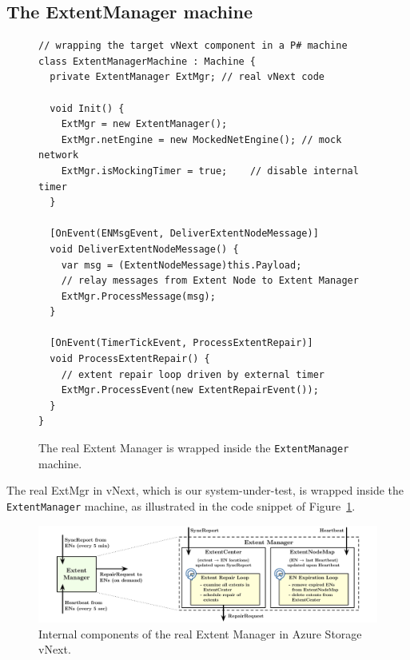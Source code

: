 \subsection{The ExtentManager machine}
\label{sec:method:wrap_target}

\begin{figure}[t]
\begin{lstlisting}
// wrapping the target vNext component in a P# machine
class ExtentManagerMachine : Machine {
  private ExtentManager ExtMgr; // real vNext code

  void Init() {
    ExtMgr = new ExtentManager();
    ExtMgr.netEngine = new MockedNetEngine(); // mock network
    ExtMgr.isMockingTimer = true;	 // disable internal timer
  }

  [OnEvent(ENMsgEvent, DeliverExtentNodeMessage)]
  void DeliverExtentNodeMessage() {
    var msg = (ExtentNodeMessage)this.Payload;
    // relay messages from Extent Node to Extent Manager
    ExtMgr.ProcessMessage(msg);
  }
	
  [OnEvent(TimerTickEvent, ProcessExtentRepair)]
  void ProcessExtentRepair() {
    // extent repair loop driven by external timer
    ExtMgr.ProcessEvent(new ExtentRepairEvent());
  }
}
\end{lstlisting}
\vspace{-3mm}
\caption{The real Extent Manager is wrapped inside the \texttt{ExtentManager} \psharp machine.}
\label{fig:wrap_target}
\end{figure}

The real ExtMgr in vNext, which is our system-under-test, is wrapped inside the \texttt{ExtentManager} machine, as illustrated in the code snippet of Figure~\ref{fig:wrap_target}.

\begin{figure}[t]
\centering
\includegraphics[width=.9\linewidth]{img/extent_manager}
\caption{Internal components of the real Extent Manager in Azure Storage vNext.}
\label{fig:extentmanager}
\vspace{-5mm}
\end{figure}


